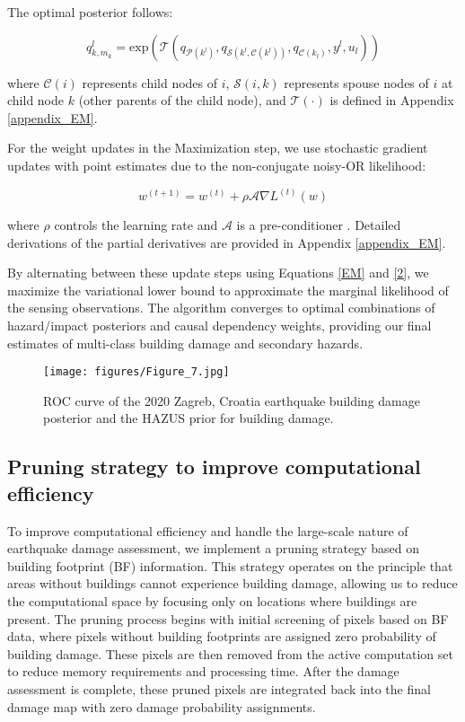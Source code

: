 \documentclass[review]{elsarticle}
\begin{document}
The optimal posterior follows:

\begin{equation}\label{EM}
   q_{k, m_{k}}^{l} = \text{exp}(\mathcal{T}(q_{\mathcal{P}(k^{l})},q_{\mathcal{S}(k^{l},\mathcal{C}(k^{l}))},q_{\mathcal{C}(k_{l})}, y^{l}, u_{l}))
\end{equation}

\noindent where $\mathcal{C}(i)$ represents child nodes of $i$, $\mathcal{S}(i,k)$ represents spouse nodes of $i$ at child node $k$ (other parents of the child node), and $\mathcal{T}(\cdot)$ is defined in Appendix \ref{appendix_EM}.




For the weight updates in the Maximization step, we use stochastic gradient updates with point estimates due to the non-conjugate noisy-OR likelihood:

\begin{equation}\label{2}
    w^{(t+1)} = w^{(t)} + \rho \mathcal{A}\nabla L^{(t)}(w)
\end{equation}

\noindent where $\rho$ controls the learning rate and $\mathcal{A}$ is a pre-conditioner \cite{paisley2011discrete}. Detailed derivations of the partial derivatives are provided in Appendix \ref{appendix_EM}.



By alternating between these update steps using Equations \ref{EM} and \ref{2}, we maximize the variational lower bound to approximate the marginal likelihood of the sensing observations. The algorithm converges to optimal combinations of hazard/impact posteriors and causal dependency weights, providing our final estimates of multi-class building damage and secondary hazards.




\begin{figure}[t]
    \centering
    \texttt{[image: figures/Figure\_7.jpg]}
    \caption{ROC curve of the 2020 Zagreb, Croatia earthquake building damage posterior and the HAZUS prior for building damage.}
    \label{Zagreb_ROC}
\end{figure}

\subsection{Pruning strategy to improve computational efficiency}
To improve computational efficiency and handle the large-scale nature of earthquake damage assessment, we implement a pruning strategy based on building footprint (BF) information. This strategy operates on the principle that areas without buildings cannot experience building damage, allowing us to reduce the computational space by focusing only on locations where buildings are present. The pruning process begins with initial screening of pixels based on BF data, where pixels without building footprints are assigned zero probability of building damage. These pixels are then removed from the active computation set to reduce memory requirements and processing time. After the damage assessment is complete, these pruned pixels are integrated back into the final damage map with zero damage probability assignments.
\end{document}
